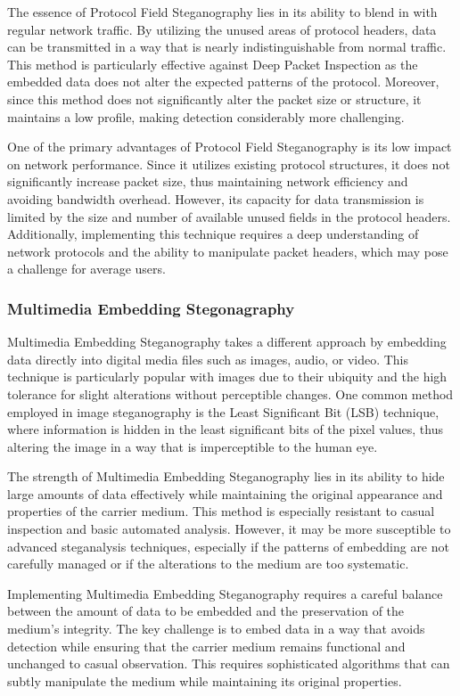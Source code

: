 \documentclass[12pt, fleqn, a4paper]{article}
\begin{document}
The essence of Protocol Field Steganography lies in its ability to blend in with regular network traffic. By utilizing the unused areas of protocol headers, data can be transmitted in a way that is nearly indistinguishable from normal traffic. This method is particularly effective against Deep Packet Inspection as the embedded data does not alter the expected patterns of the protocol. Moreover, since this method does not significantly alter the packet size or structure, it maintains a low profile, making detection considerably more challenging.

One of the primary advantages of Protocol Field Steganography is its low impact on network performance. Since it utilizes existing protocol structures, it does not significantly increase packet size, thus maintaining network efficiency and avoiding bandwidth overhead. However, its capacity for data transmission is limited by the size and number of available unused fields in the protocol headers. Additionally, implementing this technique requires a deep understanding of network protocols and the ability to manipulate packet headers, which may pose a challenge for average users.
\subsubsection{Multimedia Embedding Stegonagraphy}
Multimedia Embedding Steganography takes a different approach by embedding data directly into digital media files such as images, audio, or video. This technique is particularly popular with images due to their ubiquity and the high tolerance for slight alterations without perceptible changes. One common method employed in image steganography is the Least Significant Bit (LSB) technique, where information is hidden in the least significant bits of the pixel values, thus altering the image in a way that is imperceptible to the human eye.

The strength of Multimedia Embedding Steganography lies in its ability to hide large amounts of data effectively while maintaining the original appearance and properties of the carrier medium. This method is especially resistant to casual inspection and basic automated analysis. However, it may be more susceptible to advanced steganalysis techniques, especially if the patterns of embedding are not carefully managed or if the alterations to the medium are too systematic.

Implementing Multimedia Embedding Steganography requires a careful balance between the amount of data to be embedded and the preservation of the medium’s integrity. The key challenge is to embed data in a way that avoids detection while ensuring that the carrier medium remains functional and unchanged to casual observation. This requires sophisticated algorithms that can subtly manipulate the medium while maintaining its original properties.
\end{document}
